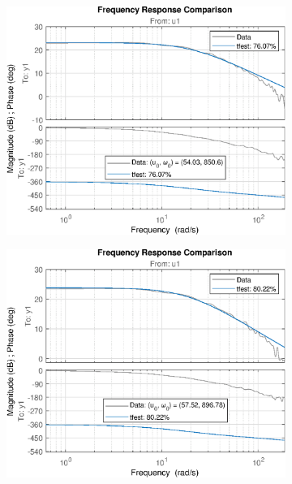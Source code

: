\begin{figure}[H]
    \centering
    \begin{minipage}{0.32\textwidth}
       \begin{figure}[H]
            \includegraphics[width = \textwidth]{./figs/small_perturbation/freq_Compare_1700.eps}
       \end{figure}
    \end{minipage}
    \begin{minipage}{0.32\textwidth}
       \begin{figure}[H]
            \includegraphics[width = \textwidth]{./figs/small_perturbation/freq_Compare_1750.eps}
       \end{figure}
    \end{minipage}
\end{figure}


